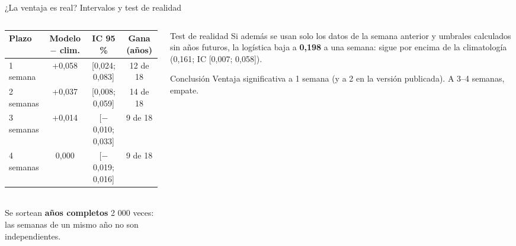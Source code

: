 \documentclass[aspectratio=169,11pt]{beamer}
\begin{document}
\begin{frame}{¿La ventaja es real? Intervalos y test de realidad}
\begin{columns}[T]
\begin{column}{0.54\textwidth}\scriptsize
\setlength{\tabcolsep}{3.5pt}
\begin{tabular}{@{}lccc@{}}\toprule
Plazo & Modelo $-$ clim. & IC 95 \% & Gana (años)\\\midrule
1 semana & +0,058 & [0,024; 0,083] & 12 de 18\\
2 semanas & +0,037 & [0,008; 0,059] & 14 de 18\\
3 semanas & +0,014 & [$-$0,010; 0,033] & 9 de 18\\
4 semanas & 0,000 & [$-$0,019; 0,016] & 9 de 18\\\bottomrule
\end{tabular}\\[4pt]
Se sortean \textbf{años completos} 2 000 veces: las semanas de un mismo año no son independientes.
\end{column}
\begin{column}{0.42\textwidth}
\begin{caja}[naranja]{Test de realidad}
Si además se usan solo los datos de la semana anterior y umbrales calculados sin años futuros, la logística baja a \textbf{0,198} a una semana: sigue por encima de la climatología (0,161; IC [0,007; 0,058]).
\end{caja}
\begin{caja}[verde]{Conclusión}
Ventaja significativa a 1 semana (y a 2 en la versión publicada). A 3–4 semanas, empate.
\end{caja}
\end{column}
\end{columns}
\end{frame}
\end{document}
